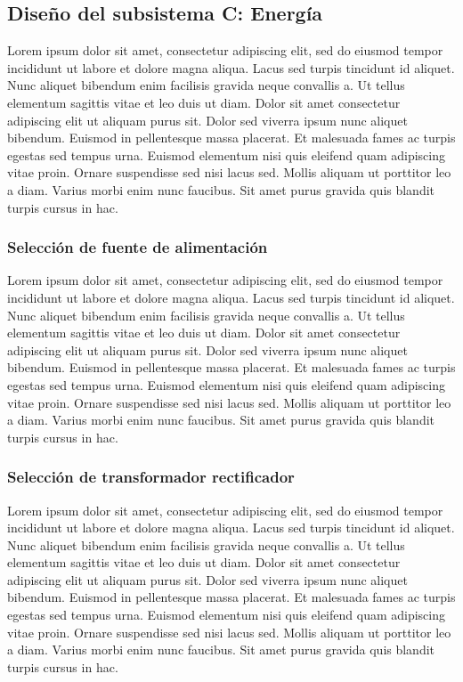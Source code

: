 \subsection{Diseño del subsistema C: Energía}

Lorem ipsum dolor sit amet, consectetur adipiscing elit, sed do eiusmod tempor incididunt ut labore et dolore magna aliqua. Lacus sed turpis tincidunt id aliquet. Nunc aliquet bibendum enim facilisis gravida neque convallis a. Ut tellus elementum sagittis vitae et leo duis ut diam. Dolor sit amet consectetur adipiscing elit ut aliquam purus sit. Dolor sed viverra ipsum nunc aliquet bibendum. Euismod in pellentesque massa placerat. Et malesuada fames ac turpis egestas sed tempus urna. Euismod elementum nisi quis eleifend quam adipiscing vitae proin. Ornare suspendisse sed nisi lacus sed. Mollis aliquam ut porttitor leo a diam. Varius morbi enim nunc faucibus. Sit amet purus gravida quis blandit turpis cursus in hac.

\subsubsection{Selección de fuente de alimentación} %

Lorem ipsum dolor sit amet, consectetur adipiscing elit, sed do eiusmod tempor incididunt ut labore et dolore magna aliqua. Lacus sed turpis tincidunt id aliquet. Nunc aliquet bibendum enim facilisis gravida neque convallis a. Ut tellus elementum sagittis vitae et leo duis ut diam. Dolor sit amet consectetur adipiscing elit ut aliquam purus sit. Dolor sed viverra ipsum nunc aliquet bibendum. Euismod in pellentesque massa placerat. Et malesuada fames ac turpis egestas sed tempus urna. Euismod elementum nisi quis eleifend quam adipiscing vitae proin. Ornare suspendisse sed nisi lacus sed. Mollis aliquam ut porttitor leo a diam. Varius morbi enim nunc faucibus. Sit amet purus gravida quis blandit turpis cursus in hac.

\subsubsection{Selección de transformador rectificador} %

Lorem ipsum dolor sit amet, consectetur adipiscing elit, sed do eiusmod tempor incididunt ut labore et dolore magna aliqua. Lacus sed turpis tincidunt id aliquet. Nunc aliquet bibendum enim facilisis gravida neque convallis a. Ut tellus elementum sagittis vitae et leo duis ut diam. Dolor sit amet consectetur adipiscing elit ut aliquam purus sit. Dolor sed viverra ipsum nunc aliquet bibendum. Euismod in pellentesque massa placerat. Et malesuada fames ac turpis egestas sed tempus urna. Euismod elementum nisi quis eleifend quam adipiscing vitae proin. Ornare suspendisse sed nisi lacus sed. Mollis aliquam ut porttitor leo a diam. Varius morbi enim nunc faucibus. Sit amet purus gravida quis blandit turpis cursus in hac.


